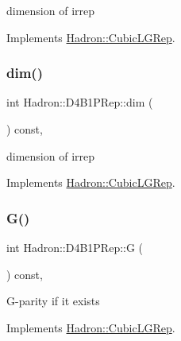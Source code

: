 dimension of irrep 

Implements \mbox{\hyperlink{structHadron_1_1CubicLGRep_a3acbaea26503ed64f20df693a48e4cdd}{Hadron\+::\+Cubic\+L\+G\+Rep}}.

\mbox{\label{structHadron_1_1D4B1PRep_aec9a69d79952beffdb9f4816ce097f30}} 
\subsubsection{\texorpdfstring{dim()}{dim()}\hspace{0.1cm}{\footnotesize\ttfamily [3/3]}}
{\footnotesize\ttfamily int Hadron\+::\+D4\+B1\+P\+Rep\+::dim (\begin{DoxyParamCaption}{ }\end{DoxyParamCaption}) const\hspace{0.3cm}{\ttfamily [inline]}, {\ttfamily [virtual]}}

dimension of irrep 

Implements \mbox{\hyperlink{structHadron_1_1CubicLGRep_a3acbaea26503ed64f20df693a48e4cdd}{Hadron\+::\+Cubic\+L\+G\+Rep}}.

\mbox{\label{structHadron_1_1D4B1PRep_adfa5387ae565f08f17ba9dc4d10c9546}} 
\subsubsection{\texorpdfstring{G()}{G()}\hspace{0.1cm}{\footnotesize\ttfamily [1/3]}}
{\footnotesize\ttfamily int Hadron\+::\+D4\+B1\+P\+Rep\+::G (\begin{DoxyParamCaption}{ }\end{DoxyParamCaption}) const\hspace{0.3cm}{\ttfamily [inline]}, {\ttfamily [virtual]}}

G-\/parity if it exists 

Implements \mbox{\hyperlink{structHadron_1_1CubicLGRep_ace26f7b2d55e3a668a14cb9026da5231}{Hadron\+::\+Cubic\+L\+G\+Rep}}.

\mbox{\label{structHadron_1_1D4B1PRep_adfa5387ae565f08f17ba9dc4d10c9546}} 
